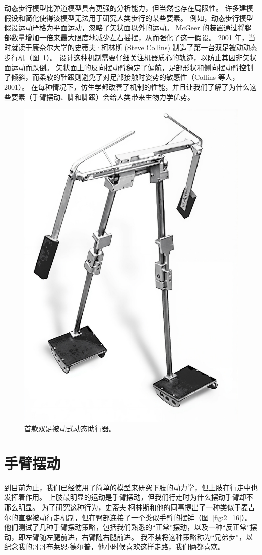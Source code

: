 动态步行模型比弹道模型具有更强的分析能力，但当然也存在局限性。
许多建模假设和简化使得该模型无法用于研究人类步行的某些要素。
例如，动态步行模型假设运动严格为平面运动，忽略了矢状面以外的运动。
McGeer 的装置通过将腿部数量增加一倍来最大限度地减少左右摇摆，从而强化了这一假设。
2001 年，当时就读于康奈尔大学的史蒂夫·柯林斯 (Steve Collins) 制造了第一台双足被动动态步行机（图~\ref{fig:2_15}）。
设计这种机制需要仔细关注机器质心的轨迹，以防止其因非矢状面运动而跌倒。
矢状面上的反向摆动臂稳定了偏航，足部形状和侧向摆动臂控制了倾斜，而柔软的鞋跟则避免了对足部接触时姿势的敏感性（Collins 等人，2001）。
在每种情况下，仿生学都改善了机制的性能，并且让我们了解了为什么这些要素（手臂摆动、脚和脚跟）会给人类带来生物力学优势。


\begin{figure}[!htb]
	\centering
	\includegraphics[width=0.45\linewidth]{chap2/2_15}
	\caption{首款双足被动式动态助行器。 \label{fig:2_15}}
\end{figure}


\section{手臂摆动}

到目前为止，我们已经使用了简单的模型来研究下肢的动力学，但上肢在行走中也发挥着作用。
上肢最明显的运动是手臂摆动，但我们行走时为什么摆动手臂却不那么明显。
为了研究这种行为，史蒂夫$\cdot$柯林斯和他的同事提出了一种类似于麦吉尔的直腿被动行走机制，但在臀部连接了一个类似手臂的摆锤（图~\ref{fig:2_16}）。
他们测试了几种手臂摆动策略，包括我们熟悉的“正常”摆动，以及一种“反正常”摆动，即左臂随左腿前进，右臂随右腿前进。
我不禁将这种策略称为“兄弟步”，以纪念我的哥哥布莱恩$\cdot$德尔普，他小时候喜欢这样走路，我们俩都喜欢。


